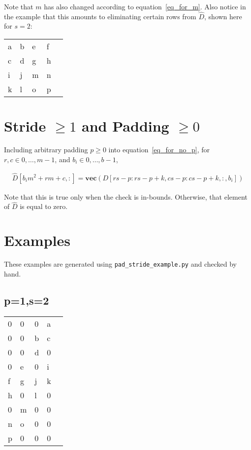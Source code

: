 \documentclass{article}
\begin{document}
Note that $m$ has also changed according to equation~\ref{eq_for_m}. Also notice in the example that this amounts to eliminating certain rows from $\widehat{D}$, shown here for $s=2$:

\begin{table}[h]
\centering
\begin{tabular}{lllll}
a & b & e & f \\
c & d & g & h \\
i & j & m & n \\
k & l & o & p
\end{tabular}
\end{table}

\section{Stride $\geq 1$ and Padding $\geq 0$}

Including arbitrary padding $p \geq 0$ into equation~\ref{eq_for_no_p}, for $r, c \in 0, \ldots, m-1$, and $b_i \in 0, \ldots, b-1$,

\begin{equation} \label{eq_with_p_and_s}
\begin{split}
\widehat{D}[b_i m^2 + rm + c, :] = \textbf{vec}(D[rs-p:rs-p+k,cs-p:cs-p+k,:,b_i])
\end{split}
\end{equation}

Note that this is true only when the check is in-bounds. Otherwise, that element of $\widehat{D}$ is equal to zero.

\section{Examples}

These examples are generated using \texttt{pad\_stride\_example.py} and checked by hand.

\subsection{p=1,s=2}

\begin{table}[h]
\centering
\begin{tabular}{lllll}
0 & 0 & 0 & a \\
0 & 0 & b & c \\
0 & 0 & d & 0 \\
0 & e & 0 & i \\
f & g & j & k \\
h & 0 & l & 0 \\
0 & m & 0 & 0 \\
n & o & 0 & 0 \\
p & 0 & 0 & 0
\end{tabular}
\end{table}
\end{document}
